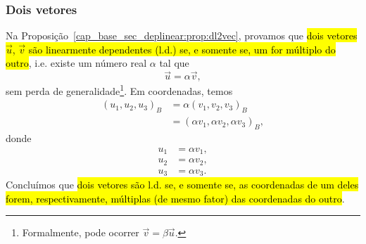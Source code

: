 \subsubsection{Dois vetores}

Na Proposição~\ref{cap_base_sec_deplinear:prop:dl2vec}, provamos que \hl{dois vetores $\vec{u}$, $\vec{v}$ são linearmente dependentes (l.d.) se, e somente se, um for múltiplo do outro}, i.e. existe um número real $\alpha$ tal que
\begin{equation}\label{cap_base_sec_base:eq:cbsb_vmv}
  \vec{u} = \alpha\vec{v},
\end{equation}
sem perda de generalidade\footnote{Formalmente, pode ocorrer $\vec{v} = \beta\vec{u}$.}. Em coordenadas, temos
\begin{align}
  (u_1, u_2, u_3)_B &= \alpha(v_1, v_2, v_3)_B\\
                    &= (\alpha v_1, \alpha v_2, \alpha v_3)_B,
\end{align}
donde
\begin{align}
  u_1 &= \alpha v_1,\\
  u_2 &= \alpha v_2,\\
  u_3 &= \alpha v_3.
\end{align}
Concluímos que \hl{dois vetores são l.d. se, e somente se, as coordenadas de um deles forem, respectivamente, múltiplas (de mesmo fator) das coordenadas do outro}.

